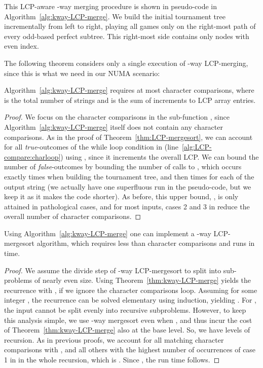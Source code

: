 \documentclass[a4paper]{myjournal}
\begin{document}
This LCP-aware -way merging procedure is shown in pseudo-code in
Algorithm~\ref{alg:kway-LCP-merge}.  We build the initial tournament tree
incrementally from left to right, playing all games only on the right-most path
of every odd-based perfect subtree.  This right-most side contains only nodes
with even index.

The following theorem considers only a single execution of -way LCP-merg\-ing,
since this is what we need in our NUMA scenario:

\begin{theorem}\label{thm:kway-LCP-merge}
  Algorithm~\ref{alg:kway-LCP-merge} requires at most  character comparisons, where  is the total number of
  strings and  is the sum of increments
  to LCP array entries.
\end{theorem}
\begin{proof}
  We focus on the character comparisons in the sub-function \LCPCompare, since
  Algorithm~\ref{alg:kway-LCP-merge} itself does not contain any character
  comparisons. As in the proof of Theorem~\ref{thm:LCP-mergesort}, we can
  account for all \textsl{true}-outcomes of the while loop condition in
  \LCPCompare (line~\ref{alg:LCP-compare:charloop}) using , since it
  increments the overall LCP. We can bound the number of \textsl{false}-outcomes
  by bounding the number of calls to \LCPCompare, which occurs exactly  times
  when building the tournament tree, and then  times for each of the
   output string (we actually have one superfluous run in the pseudo-code,
  but we keep it as it makes the code shorter).  As before, this upper bound,
  , is only attained in pathological cases, and for
  most inputs, cases 2 and 3 in \LCPCompare reduce the overall number of
  character comparisons.
\end{proof}

\begin{theorem}
  Using Algorithm~\ref{alg:kway-LCP-merge} one can implement a -way
  LCP-mergesort algorithm, which requires less than  character comparisons and runs in
   time.
\end{theorem}
\begin{proof}
  We assume the divide step of -way LCP-mergesort to split into 
  sub-problems of nearly even size. Using Theorem~\ref{thm:kway-LCP-merge}
  yields the recurrence  with
  , if we ignore the character comparisons loop.  Assuming 
  for some integer , the recurrence can be solved elementary using induction,
  yielding . For , the input cannot be split evenly into recursive subproblems. However, to
  keep this analysis simple, we use -way mergesort even when , and
  thus incur the cost of Theorem~\ref{thm:kway-LCP-merge} also at the base
  level. So, we have  levels of recursion. As in
  previous proofs, we account for all matching character comparisons with ,
  and all others with the highest number of occurrences of case 1 in \LCPCompare
  in the whole recursion, which is . Since , the run time
  follows.
\end{proof}
\end{document}
